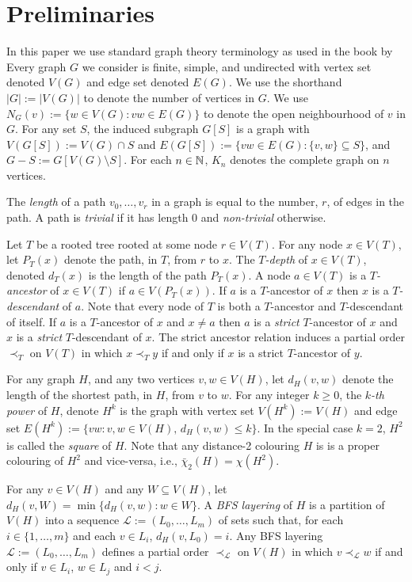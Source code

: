 \documentclass[kpfonts]{patmorin}
\newcommand{\dtcn}{\bar{\chi}_2}
\theoremstyle{named}
\begin{document}
\section{Preliminaries}

In this paper we use standard graph theory terminology as used in the book by \citet{diestel:graph}
Every graph $G$ we consider is finite, simple, and undirected with vertex set denoted $V(G)$ and edge set denoted $E(G)$.  We use the shorthand $|G|:=|V(G)|$ to denote the number of vertices in $G$.  We use $N_G(v):=\{w\in V(G): vw\in E(G)\}$ to denote the open neighbourhood of $v$ in $G$.  For any set $S$, the induced subgraph  $G[S]$ is a graph with $V(G[S]):=V(G)\cap S$ and $E(G[S]):=\{vw\in E(G): \{v,w\}\subseteq S\}$, and $G-S:=G[V(G)\setminus S]$. For each $n\in\mathbb{N}$, $K_n$ denotes the complete graph on $n$ vertices.

The \emph{length} of a path $v_0,\ldots,v_r$ in a graph is equal to the number, $r$, of edges in the path. A path is \emph{trivial} if it has length 0 and \emph{non-trivial} otherwise.

Let $T$ be a rooted tree rooted at some node $r\in V(T)$.  For any node $x\in V(T)$, let $P_T(x)$ denote the path, in $T$, from $r$ to $x$.  The \emph{$T$-depth} of $x\in V(T)$, denoted $d_T(x)$ is the length of the path $P_T(x)$.  A node $a\in V(T)$ is a \emph{$T$-ancestor} of $x\in V(T)$ if $a\in V(P_T(x))$. If $a$ is a $T$-ancestor of $x$ then $x$ is a \emph{$T$-descendant} of $a$.  Note that every node of $T$ is both a $T$-ancestor and $T$-descendant of itself.  If $a$ is a $T$-ancestor of $x$ and $x\neq a$ then $a$ is a \emph{strict} $T$-ancestor of $x$ and $x$ is a \emph{strict} $T$-descendant of $x$.  The strict ancestor relation induces a partial order $\prec_T$ on $V(T)$ in which $x\prec_T y$ if and only if $x$ is a strict $T$-ancestor of $y$.

For any graph $H$, and any two vertices $v,w\in V(H)$, let $d_H(v,w)$ denote the length of the shortest path, in $H$, from $v$ to $w$. For any integer $k\ge 0$, the \emph{$k$-th power} of $H$, denote $H^k$ is the graph with vertex set $V(H^k):=V(H)$ and edge set $E(H^{k}):=\{vw:v,w\in V(H),\,d_H(v,w)\le k\}$. In the special case $k=2$, $H^2$ is called the \emph{square} of $H$.  Note that any distance-2 colouring $H$ is is a proper colouring of $H^2$ and vice-versa, i.e., $\dtcn(H)=\chi(H^2)$.

For any $v\in V(H)$ and any $W\subseteq V(H)$, let $d_H(v,W)=\min\{d_H(v,w):w\in W\}$. A \emph{BFS layering} of $H$ is a partition of $V(H)$ into a sequence $\mathcal{L}:=(L_0,\ldots,L_m)$ of sets such that, for each $i\in\{1,\ldots,m\}$ and each $v\in L_i$, $d_H(v,L_0)=i$.  Any BFS layering $\mathcal{L}:=(L_0,\ldots,L_m)$ defines a partial order $\prec_{\mathcal{L}}$ on $V(H)$ in which $v\prec_{\mathcal{L}} w$ if and only if $v\in L_i$, $w\in L_j$ and $i<j$.
\end{document}
